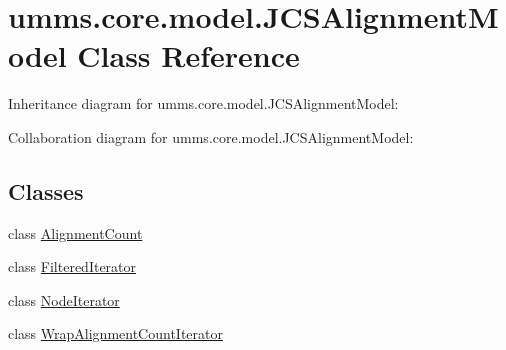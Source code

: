 \hypertarget{classumms_1_1core_1_1model_1_1_j_c_s_alignment_model}{\section{umms.\+core.\+model.\+J\+C\+S\+Alignment\+Model Class Reference}
\label{classumms_1_1core_1_1model_1_1_j_c_s_alignment_model}
}


Inheritance diagram for umms.\+core.\+model.\+J\+C\+S\+Alignment\+Model\+:


Collaboration diagram for umms.\+core.\+model.\+J\+C\+S\+Alignment\+Model\+:
\subsection*{Classes}
\begin{DoxyCompactItemize}
\item 
class \hyperlink{classumms_1_1core_1_1model_1_1_j_c_s_alignment_model_1_1_alignment_count}{Alignment\+Count}
\item 
class \hyperlink{classumms_1_1core_1_1model_1_1_j_c_s_alignment_model_1_1_filtered_iterator}{Filtered\+Iterator}
\item 
class \hyperlink{classumms_1_1core_1_1model_1_1_j_c_s_alignment_model_1_1_node_iterator}{Node\+Iterator}
\item 
class \hyperlink{classumms_1_1core_1_1model_1_1_j_c_s_alignment_model_1_1_wrap_alignment_count_iterator}{Wrap\+Alignment\+Count\+Iterator}
\end{DoxyCompactItemize}
